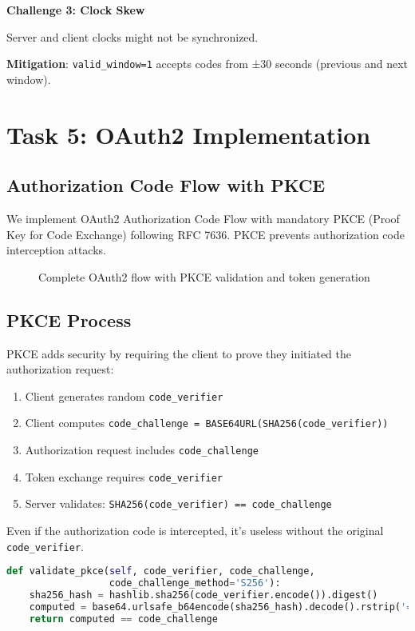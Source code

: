 \documentclass[12pt,a4paper]{article}
\begin{document}
\textbf{Challenge 3: Clock Skew}

Server and client clocks might not be synchronized.

\textbf{Mitigation}: \texttt{valid\_window=1} accepts codes from ±30 seconds (previous and next window).

\section{Task 5: OAuth2 Implementation}

\subsection{Authorization Code Flow with PKCE}

We implement OAuth2 Authorization Code Flow with mandatory PKCE (Proof Key for Code Exchange) following RFC 7636. PKCE prevents authorization code interception attacks.

\begin{figure}[H]
    \centering
    
    \caption{Complete OAuth2 flow with PKCE validation and token generation}
    \label{fig:oauth2}
\end{figure}

\subsection{PKCE Process}

PKCE adds security by requiring the client to prove they initiated the authorization request:

\begin{enumerate}
    \item Client generates random \texttt{code\_verifier}
    \item Client computes \texttt{code\_challenge = BASE64URL(SHA256(code\_verifier))}
    \item Authorization request includes \texttt{code\_challenge}
    \item Token exchange requires \texttt{code\_verifier}
    \item Server validates: \texttt{SHA256(code\_verifier) == code\_challenge}
\end{enumerate}

Even if the authorization code is intercepted, it's useless without the original \texttt{code\_verifier}.

\begin{lstlisting}[language=Python, caption=PKCE Validation]
def validate_pkce(self, code_verifier, code_challenge,
                  code_challenge_method='S256'):
    sha256_hash = hashlib.sha256(code_verifier.encode()).digest()
    computed = base64.urlsafe_b64encode(sha256_hash).decode().rstrip('=')
    return computed == code_challenge
\end{lstlisting}
\end{document}
